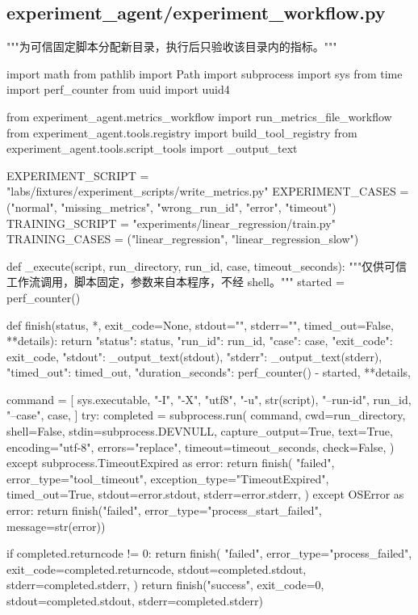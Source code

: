 \documentclass[UTF8,zihao=-4,fontset=fandol]{ctexart}
\begin{document}
\subsection{experiment\_agent/experiment\_workflow.py}

\begin{Code}
"""为可信固定脚本分配新目录，执行后只验收该目录内的指标。"""

import math
from pathlib import Path
import subprocess
import sys
from time import perf_counter
from uuid import uuid4

from experiment_agent.metrics_workflow import run_metrics_file_workflow
from experiment_agent.tools.registry import build_tool_registry
from experiment_agent.tools.script_tools import _output_text


EXPERIMENT_SCRIPT = "labs/fixtures/experiment_scripts/write_metrics.py"
EXPERIMENT_CASES = ("normal", "missing_metrics", "wrong_run_id", "error", "timeout")
TRAINING_SCRIPT = "experiments/linear_regression/train.py"
TRAINING_CASES = ("linear_regression", "linear_regression_slow")


def _execute(script, run_directory, run_id, case, timeout_seconds):
    """仅供可信工作流调用，脚本固定，参数来自本程序，不经 shell。"""
    started = perf_counter()

    def finish(status, *, exit_code=None, stdout="", stderr="", timed_out=False, **details):
        return {
            "status": status, "run_id": run_id, "case": case,
            "exit_code": exit_code, "stdout": _output_text(stdout),
            "stderr": _output_text(stderr), "timed_out": timed_out,
            "duration_seconds": perf_counter() - started, **details,
        }

    command = [
        sys.executable, "-I", "-X", "utf8", "-u", str(script),
        "--run-id", run_id, "--case", case,
    ]
    try:
        completed = subprocess.run(
            command, cwd=run_directory, shell=False, stdin=subprocess.DEVNULL,
            capture_output=True, text=True, encoding="utf-8", errors="replace",
            timeout=timeout_seconds, check=False,
        )
    except subprocess.TimeoutExpired as error:
        return finish(
            "failed", error_type="tool_timeout", exception_type="TimeoutExpired",
            timed_out=True, stdout=error.stdout, stderr=error.stderr,
        )
    except OSError as error:
        return finish("failed", error_type="process_start_failed", message=str(error))

    if completed.returncode != 0:
        return finish(
            "failed", error_type="process_failed", exit_code=completed.returncode,
            stdout=completed.stdout, stderr=completed.stderr,
        )
    return finish("success", exit_code=0, stdout=completed.stdout, stderr=completed.stderr)



\end{Code}
\end{document}
